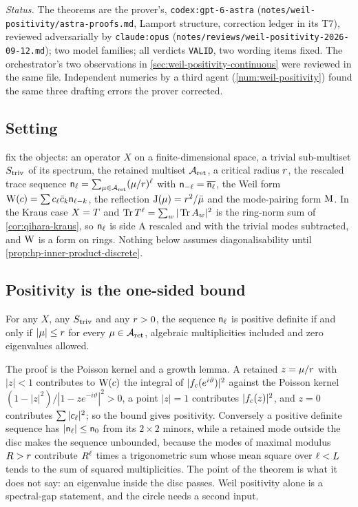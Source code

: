 \emph{Status.} The theorems are the prover's, \texttt{codex:gpt-6-astra}
(\texttt{notes/weil-positivity/astra-proofs.md}, Lamport structure, correction ledger in
its T7), reviewed adversarially by \texttt{claude:opus}
(\texttt{notes/reviews/weil-positivity-2026-09-12.md}); two model families; all verdicts
\texttt{VALID}, two wording items fixed. The orchestrator's two observations in
\cref{sec:weil-positivity-continuous} were reviewed in the same file. Independent
numerics by a third agent (\cref{num:weil-positivity}) found the same three drafting
errors the prover corrected.

\subsection{Setting}

 fix the objects: an operator $X$ on a
finite-dimensional space, a trivial sub-multiset $S_{\mathrm{triv}}$ of its spectrum, the retained
multiset $\mathcal A_{\mathrm{ret}}$, a critical radius $r$, the rescaled trace sequence
$\mathsf n_{\ell} = \sum_{\mu\in\mathcal A_{\mathrm{ret}}}(\mu/r)^{\ell}$ with $\mathsf n_{-\ell} =
\overline{\mathsf n_{\ell}}$, the Weil form $\mathrm{W}(c) = \sum c_{\ell}\bar c_k\mathsf n_{\ell-k}$, the
reflection $\mathrm{J}(\mu) = r^2/\bar{\mu}$ and the mode-pairing form $\mathrm{M}$. In
the Kraus case $X = T$ and $\operatorname{Tr}T^{\ell} = \sum_w|\operatorname{Tr}A_{w}|^2$ is the ring-norm sum
of \cref{cor:qihara-kraus}, so $\mathsf n_{\ell}$ is side A rescaled and with the trivial modes
subtracted, and $\mathrm{W}$ is a form on rings. Nothing below assumes diagonalisability
until \cref{prop:hp-inner-product-discrete}.

\subsection{Positivity is the one-sided bound}

\begin{theorem}
\label{thm:weil-positivity-finite}
For any $X$, any $S_{\mathrm{triv}}$ and any $r>0$, the sequence $\mathsf n_{\ell}$ is positive definite
if and only if $|\mu|\le r$ for every $\mu\in\mathcal A_{\mathrm{ret}}$, algebraic multiplicities
included and zero eigenvalues allowed.
\end{theorem}

The proof is the Poisson kernel and a growth lemma. A retained $z = \mu/r$
with $|z|<1$ contributes to $\mathrm{W}(c)$ the integral of $|f_{c}(e^{i\vartheta})|^2$
against the Poisson kernel $(1-|z|^2)/|1-ze^{-i\vartheta}|^2>0$, a point $|z| = 1$
contributes $|f_{c}(z)|^2$, and $z = 0$ contributes $\sum|c_{\ell}|^2$; so the bound
gives positivity. Conversely a positive definite sequence has $|\mathsf n_{\ell}|\le\mathsf n_{0}$
from its $2\times2$ minors, while a retained mode outside the disc makes the sequence
unbounded, because the modes of maximal modulus $R>r$ contribute $R^{\ell}$ times a
trigonometric sum whose mean square over $\ell<L$ tends to the sum of squared
multiplicities. The point of the theorem is what it does not say: an eigenvalue inside the
disc passes. Weil positivity alone is a spectral-gap statement, and the circle needs a
second input.

